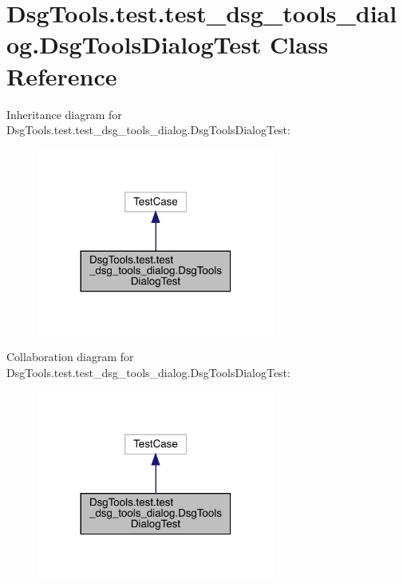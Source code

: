 \hypertarget{class_dsg_tools_1_1test_1_1test__dsg__tools__dialog_1_1_dsg_tools_dialog_test}{}\section{Dsg\+Tools.\+test.\+test\+\_\+dsg\+\_\+tools\+\_\+dialog.\+Dsg\+Tools\+Dialog\+Test Class Reference}
\label{class_dsg_tools_1_1test_1_1test__dsg__tools__dialog_1_1_dsg_tools_dialog_test}


Inheritance diagram for Dsg\+Tools.\+test.\+test\+\_\+dsg\+\_\+tools\+\_\+dialog.\+Dsg\+Tools\+Dialog\+Test\+:
\nopagebreak
\begin{figure}[H]
\begin{center}
\leavevmode
\includegraphics[width=221pt]{class_dsg_tools_1_1test_1_1test__dsg__tools__dialog_1_1_dsg_tools_dialog_test__inherit__graph}
\end{center}
\end{figure}


Collaboration diagram for Dsg\+Tools.\+test.\+test\+\_\+dsg\+\_\+tools\+\_\+dialog.\+Dsg\+Tools\+Dialog\+Test\+:
\nopagebreak
\begin{figure}[H]
\begin{center}
\leavevmode
\includegraphics[width=221pt]{class_dsg_tools_1_1test_1_1test__dsg__tools__dialog_1_1_dsg_tools_dialog_test__coll__graph}
\end{center}
\end{figure}
